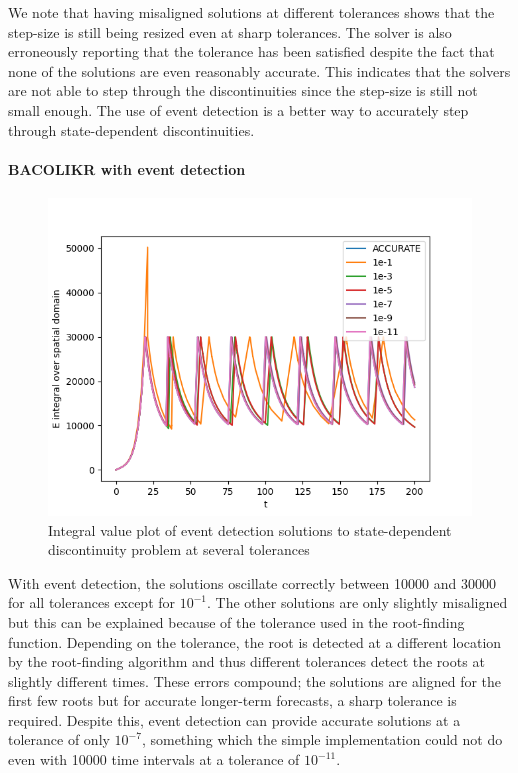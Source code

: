 \documentclass{article}
\begin{document}
We note that having misaligned solutions at different tolerances shows that the step-size is still being resized even at sharp tolerances. The solver is also erroneously reporting that the tolerance has been satisfied despite the fact that none of the solutions are even reasonably accurate. This indicates that the solvers are not able to step through the discontinuities since the step-size is still not small enough. The use of event detection is a better way to accurately step through state-dependent discontinuities.

\paragraph{BACOLIKR with event detection}
\begin{figure}[H]
\centering
\includegraphics[width=0.7\linewidth]{./figures/pde_state_disc_tol_event}
\caption{Integral value plot of event detection solutions to state-dependent discontinuity problem at several tolerances}
\label{fig:pde_state_disc_tol_event}
\end{figure}

With event detection, the solutions oscillate correctly between 10000 and 30000 for all tolerances except for $10^{-1}$. The other solutions are only slightly misaligned but this can be explained because of the tolerance used in the root-finding function. Depending on the tolerance, the root is detected at a different location by the root-finding algorithm and thus different tolerances detect the roots at slightly different times. These errors compound; the solutions are aligned for the first few roots but for accurate longer-term forecasts, a sharp tolerance is required. Despite this, event detection can provide accurate solutions at a tolerance of only $10^{-7}$, something which the simple implementation could not do even with 10000 time intervals at a tolerance of $10^{-11}$.
\end{document}
